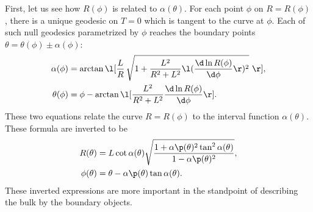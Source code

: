 \documentclass[12pt]{article}
\begin{document}
First, let us see how $R(\phi)$ is related to $\alpha(\theta)$.
For each point $\phi$ on $R=R(\phi)$, there is a unique geodesic on $T=0$ which is tangent to the curve at $\phi$.
Each of such null geodesics parametrized by $\phi$ reaches the boundary points $\theta = \theta(\phi) \pm \alpha(\phi)$:
\begin{align}
	\alpha(\phi) &= \arctan\l[\frac{L}{R}\,\sqrt{1 + \frac{L^2}{R^2+L^2}\l(\frac{\d \ln R(\phi)}{\d\phi} \r)^2} \,\,\r],\\
	\theta(\phi) &= \phi - \arctan\l[\frac{L^2}{R^2 + L^2}\frac{\d\ln R(\phi)}{\d \phi} \r].
\end{align}
These two equations relate the curve $R=R(\phi)$ to the interval function $\alpha(\theta)$.
These formula are inverted to be
\begin{align}
	R(\theta) &= L\cot\alpha(\theta) \sqrt{\frac{1 + \alpha\p(\theta)^2\tan^2\alpha(\theta)}{1-\alpha\p(\theta)^2}},\label{eq:R}\\
	\phi(\theta) &= \theta - \alpha\p(\theta)\tan\alpha(\theta).\label{eq:phi}
\end{align}
These inverted expressions are more important in the standpoint of describing the bulk by the boundary objects.
\end{document}

